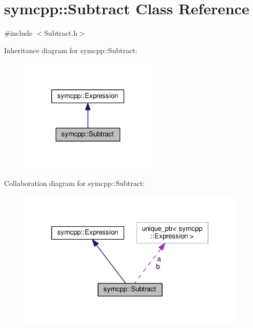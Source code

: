 \hypertarget{classsymcpp_1_1Subtract}{}\section{symcpp\+:\+:Subtract Class Reference}
\label{classsymcpp_1_1Subtract}


{\ttfamily \#include $<$Subtract.\+h$>$}



Inheritance diagram for symcpp\+:\+:Subtract\+:\nopagebreak
\begin{figure}[H]
\begin{center}
\leavevmode
\includegraphics[width=186pt]{classsymcpp_1_1Subtract__inherit__graph}
\end{center}
\end{figure}


Collaboration diagram for symcpp\+:\+:Subtract\+:\nopagebreak
\begin{figure}[H]
\begin{center}
\leavevmode
\includegraphics[width=310pt]{classsymcpp_1_1Subtract__coll__graph}
\end{center}
\end{figure}
